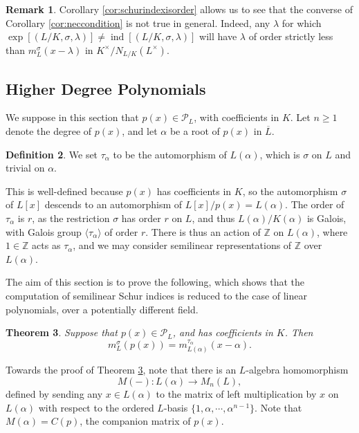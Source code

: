 \documentclass[10pt, reqno, hidelinks]{amsart}
\DeclareMathOperator{\ind}{ind}
\newcommand{\bZ}{{\mathbb Z}}
\newcommand{\sP}{{\mathcal P}}
\newtheorem{thm}{Theorem}
\numberwithin{thm}{subsection}
\theoremstyle{definition}
\newtheorem{defn}[thm]{Definition}
\newtheorem{remark}[thm]{Remark}
\begin{document}
\begin{remark}\label{rem:notsufficient}
Corollary \ref{cor:schurindexisorder} allows us to see that the converse of Corollary \ref{cor:neccondition} is not true in general. Indeed, any $\lambda$ for which $\exp[(L/K,  \sigma, \lambda)] \neq \ind[(L/K,  \sigma, \lambda)]$ will have $\lambda$ of order strictly less than $m_L^{\sigma}(x-\lambda)$ in $K^{\times} / N_{L/K}(L^{\times})$.
\end{remark}

\subsection{Higher Degree Polynomials}\label{sect:higherdegree}

We suppose in this section that $p(x) \in \sP_L$, with coefficients in $K$. Let $n \geq 1$ denote the degree of $p(x)$, and let $\alpha$ be a root of $p(x)$ in $\overline{L}$.

\begin{defn}\label{def:taualpha}
We set $\tau_{\alpha}$ to be the automorphism of $L(\alpha)$, which is $\sigma$ on $L$ and trivial on $\alpha$.
\end{defn}

This is well-defined because $p(x)$ has coefficients in $K$, so the automorphism $\sigma$ of $L[x]$ descends to an automorphism of $L[x] / p(x) = L(\alpha)$. The order of $\tau_{\alpha}$ is $r$, as the restriction $\sigma$ has order $r$ on $L$, and thus $L(\alpha) / K(\alpha)$ is Galois, with Galois group $\langle \tau_{\alpha} \rangle$ of order $r$. There is thus an action of $\bZ$ on $L(\alpha)$, where $1 \in \bZ$ acts as $\tau_{\alpha}$, and we may consider semilinear representations of $\bZ$ over $L(\alpha)$.

The aim of this section is to prove the following, which shows that the computation of semilinear Schur indices is reduced to the case of linear polynomials, over a potentially different field. 

\begin{thm}\label{thm:schurindexpx}
	Suppose that $p(x) \in \sP_L$, and has coefficients in $K$. Then
	\[
	m_L^{\sigma}(p(x)) = m_{L(\alpha)}^{\tau_{\alpha}}(x - \alpha).
	\]
\end{thm}

Towards the proof of Theorem \ref{thm:schurindexpx}, note that there is an $L$-algebra homomorphism
\[
M(-): L(\alpha) \rightarrow M_n(L),
\]
defined by sending any $x \in L(\alpha)$ to the matrix of left multiplication by $x$ on $L(\alpha)$ with respect to the ordered $L$-basis $\{1, \alpha, \cdots , \alpha^{n-1}\}$. Note that $M(\alpha) = C(p)$, the companion matrix of $p(x)$.
\end{document}
